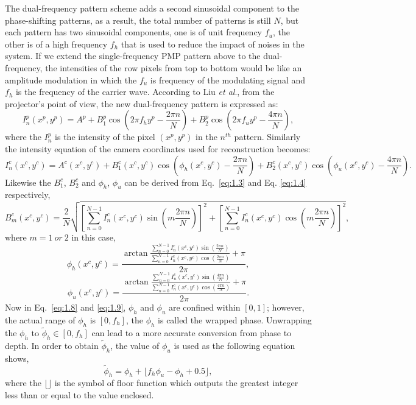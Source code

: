 \documentclass[]{spie}  %
\begin{document}
The dual-frequency pattern scheme adds a second sinusoidal component to the phase-shifting patterns, as a result, the total number of patterns is still $N$, but each pattern has two sinusoidal components, one is of unit frequency $f_u$, the other is of a high frequency $f_h$ that is used to reduce the impact of noises in the system. If we extend the single-frequency PMP pattern above to the dual-frequency, the intensities of the row pixels from top to bottom would be like an amplitude modulation in which the $f_u$ is frequency of the modulating signal and $f_h$ is the frequency of the carrier wave. According to Liu \textit{et al}., from the projector's point of view, the new dual-frequency pattern is expressed as:
  \begin{equation} \label{eq:1.5}
  	I^p_n(x^p, y^p) = A^p + B^p_1\cos\left(2\pi f_h y^p - \frac{2\pi n}{N}\right) + B^p_2\cos\left(2\pi f_u y^p - \frac{4\pi n}{N}\right),
  \end{equation}
where the $I^p_n$ is the intensity of the pixel $(x^p, y^p)$ in the $n^{th}$ pattern. Similarly the intensity equation of the camera coordinates used for reconstruction becomes:
 \begin{equation} \label{eq:1.6}
  	I^c_n(x^c, y^c) =  A^c(x^c, y^c) + B^c_1(x^c, y^c)\cos\left(\phi_h(x^c, y^c) - \frac{2\pi n}{N}\right) + B^c_2(x^c, y^c)\cos\left(\phi_u(x^c, y^c) - \frac{4\pi n}{N}\right).
  \end{equation}
Likewise the $B^c_1$, $B^c_2$ and $\phi_h$, $\phi_u$ can be derived from Eq.~\eqref{eq:1.3} and Eq. \eqref{eq:1.4} respectively,
  \begin{equation} \label{eq:1.7}
  	B^c_m(x^c, y^c) = \frac{2}{N}\sqrt{\left[\sum_{n=0}^{N-1}I_n^c(x^c, y^c)\sin (m\frac{2\pi n}{N})\right]^2 + \left[\sum_{n=0}^{N-1}I_n^c(x^c, y^c)\cos (m\frac{2\pi n}{N})\right]^2},
  \end{equation}
where $m = 1\: or\: 2$ in this case,
 \begin{equation} \label{eq:1.8}
  	\phi_h (x^c, y^c) = \frac{\arctan \frac{\sum_{n=0}^{N-1} I^c_n(x^c, y^c)\sin(\frac{2\pi n}{N})}{\sum_{n=0}^{N-1} I^c_n(x^c, y^c)\cos(\frac{2\pi n}{N})} + \pi}{2\pi},
  \end{equation}
 \begin{equation} \label{eq:1.9}
  	\phi_u (x^c, y^c) = \frac{\arctan \frac{\sum_{n=0}^{N-1} I^c_n(x^c, y^c)\sin(\frac{4\pi n}{N})}{\sum_{n=0}^{N-1} I^c_n(x^c, y^c)\cos(\frac{4\pi n}{N})} + \pi}{2\pi}.
  \end{equation}
Now in Eq.~\eqref{eq:1.8} and \eqref{eq:1.9}, $\phi_h$ and $\phi_u$ are confined within $[0, 1]$; however, the actual range of $\phi_h$ is $[0, f_h]$, the  $\phi_h$ is called the wrapped phase. Unwrapping the $\phi_h$ to $\tilde{\phi}_h \in [0, f_h]$ can lead to a more accurate conversion from phase to depth.  In order to obtain $\tilde{\phi}_h$, the value of $\phi_u$ is used as the following equation shows,
  \begin{equation} \label{eq:1.10}
	 \tilde{\phi}_h = \phi_h + \lfloor f_h \phi_u - \phi_h + 0.5 \rfloor,
  \end{equation}
where the $\lfloor \rfloor$ is the symbol of floor function which outputs the greatest integer less than or equal to the value enclosed.
\end{document}
